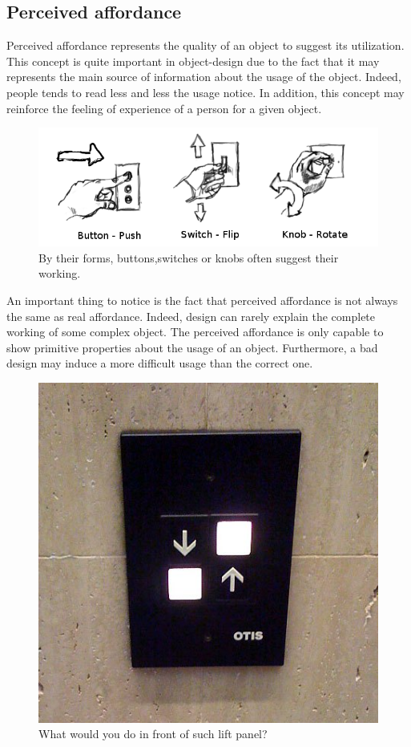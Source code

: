 \documentclass[a4paper,11pt] {article}
\theoremstyle{definition}
\begin{document}
\subsection{Perceived affordance}
Perceived affordance represents the quality of an object to suggest its utilization. This concept is quite important in object-design due to the fact that it may represents the main source of information about the usage of the object. Indeed, people tends to read less and less the usage notice. In addition, this concept may reinforce the feeling of experience of a person for a given object.
\begin{figure}[h]
\centering
\includegraphics[scale=0.40]{switches-only.png}
\caption{By their forms, buttons,switches or knobs often suggest their working.}
\end{figure}

An important thing to notice is the fact that perceived affordance is not always the same as real affordance.
Indeed, design can rarely explain the complete working of some complex object. The perceived affordance is only capable to show primitive properties about the usage of an object. Furthermore, a bad design may induce a more difficult usage than the correct one.%
\begin{figure}[h]
\centering
\includegraphics[scale=0.20]{bad-switches.jpg}
\caption{What would you do in front of such lift panel?}
\end{figure}
\end{document}
